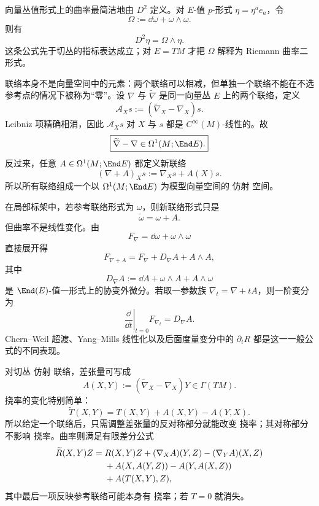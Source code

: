 向量丛值形式上的曲率最简洁地由 $D^2$ 定义。对 $E$-值 $p$-形式 $\eta=\eta^ae_a$，令
\[
\Omega:=\dd\omega+\omega\wedge\omega.
\]
则有
\begin{equation}\label{eq:math-dg-covariant-derivative-square}
\boxed{D^2\eta=\Omega\wedge\eta.}
\end{equation}
这条公式先于切丛的指标表达成立；对 $E=TM$ 才把 $\Omega$ 解释为 Riemann 曲率二形式。

联络本身不是向量空间中的元素：两个联络可以相减，但单独一个联络不能在不选参考点的情况下被称为“零”。设 $\nabla$ 与 $\widetilde\nabla$ 是同一向量丛 $E$ 上的两个联络，定义
\[
\mathcal A_Xs
:=(\widetilde\nabla_X-\nabla_X)s.
\]
Leibniz 项精确相消，因此 $\mathcal A_Xs$ 对 $X$ 与 $s$ 都是 $C^\infty(M)$-线性的。故
\begin{equation*}\boxed{
\widetilde\nabla-\nabla
\in\Omega^1(M;\End E).
}\end{equation*}
反过来，任意 $A\in\Omega^1(M;\End E)$ 都定义新联络
\[
(\nabla+A)_Xs:=\nabla_Xs+A(X)s.
\]
所以所有联络组成一个以 $\Omega^1(M;\End E)$ 为模型向量空间的 仿射 空间。

在局部标架中，若参考联络形式为 $\omega$，则新联络形式只是
\[
\widetilde\omega=\omega+A.
\]
但曲率不是线性变化。由
\[
F_\nabla=\dd\omega+\omega\wedge\omega
\]
直接展开得
\begin{equation}
\boxed{
F_{\nabla+A}
=F_\nabla+D_\nabla A+A\wedge A,
}
\label{eq:math-dg-curvature-finite-perturbation}
\end{equation}
其中
\[
D_\nabla A
:=\dd A+\omega\wedge A+A\wedge\omega
\]
是 $\End(E)$-值一形式上的协变外微分。若取一参数族 $\nabla_t=\nabla+tA$，则一阶变分为
\begin{equation*}\left.\frac{\dd}{\dd t}\right|_{t=0}F_{\nabla_t}
=D_\nabla A.\end{equation*}
Chern--Weil 超渡、Yang--Mills 线性化以及后面度量变分中的 $\partial_tR$ 都是这一一般公式的不同表现。

对切丛 仿射 联络，差张量可写成
\[
A(X,Y):=(\widetilde\nabla_X-\nabla_X)Y
\in\Gamma(TM).
\]
挠率的变化特别简单：
\begin{equation*}\boxed{
\widetilde T(X,Y)
=T(X,Y)+A(X,Y)-A(Y,X).
}\end{equation*}
所以给定一个联络后，只需调整差张量的反对称部分就能改变 挠率；其对称部分不影响 挠率。曲率则满足有限差分公式
\begin{align}
\widetilde R(X,Y)Z
={}&R(X,Y)Z
+(\nabla_XA)(Y,Z)-(\nabla_YA)(X,Z)\notag\\
&+A(X,A(Y,Z))-A(Y,A(X,Z))\notag\\
&+A(T(X,Y),Z),
\label{eq:math-dg-curvature-connection-change}
\end{align}
其中最后一项反映参考联络可能本身有 挠率；若 $T=0$ 就消失。

